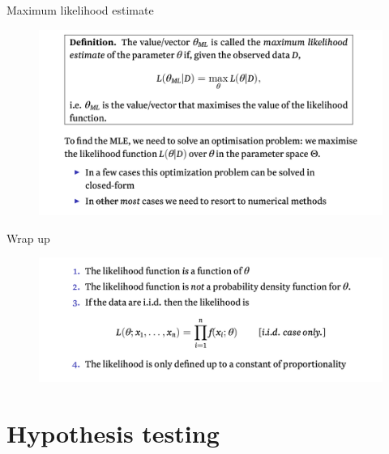 \documentclass{beamer}
\begin{document}
\begin{frame}{Maximum likelihood estimate}

        \begin{figure}
                \includegraphics[width=\linewidth]{like9.png}
        \end{figure}

\end{frame}

\begin{frame}{Wrap up}

	\begin{figure}
                \includegraphics[width=\linewidth]{like10.png}
        \end{figure}

\end{frame}

\section{Hypothesis testing}
\end{document}
